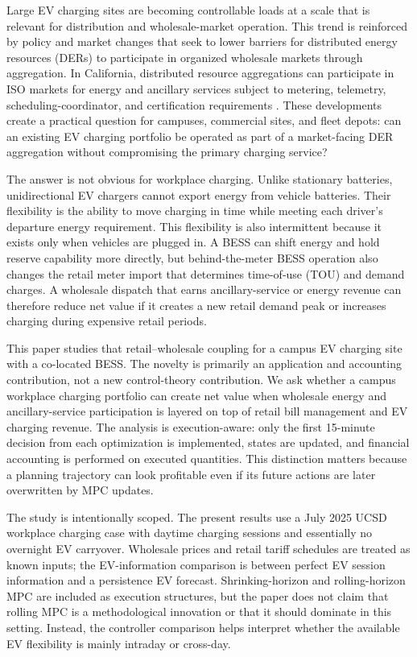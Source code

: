 \documentclass[final,5p,times]{elsarticle}
\begin{document}
Large EV charging sites are becoming controllable loads at a scale that is relevant for distribution and wholesale-market operation. This trend is reinforced by policy and market changes that seek to lower barriers for distributed energy resources (DERs) to participate in organized wholesale markets through aggregation. In California, distributed resource aggregations can participate in ISO markets for energy and ancillary services subject to metering, telemetry, scheduling-coordinator, and certification requirements \cite{ferc2222}. These developments create a practical question for campuses, commercial sites, and fleet depots: can an existing EV charging portfolio be operated as part of a market-facing DER aggregation without compromising the primary charging service?

The answer is not obvious for workplace charging. Unlike stationary batteries, unidirectional EV chargers cannot export energy from vehicle batteries. Their flexibility is the ability to move charging in time while meeting each driver's departure energy requirement. This flexibility is also intermittent because it exists only when vehicles are plugged in. A BESS can shift energy and hold reserve capability more directly, but behind-the-meter BESS operation also changes the retail meter import that determines time-of-use (TOU) and demand charges. A wholesale dispatch that earns ancillary-service or energy revenue can therefore reduce net value if it creates a new retail demand peak or increases charging during expensive retail periods.

This paper studies that retail--wholesale coupling for a campus EV charging site with a co-located BESS. The novelty is primarily an application and accounting contribution, not a new control-theory contribution. We ask whether a campus workplace charging portfolio can create net value when wholesale energy and ancillary-service participation is layered on top of retail bill management and EV charging revenue. The analysis is execution-aware: only the first 15-minute decision from each optimization is implemented, states are updated, and financial accounting is performed on executed quantities. This distinction matters because a planning trajectory can look profitable even if its future actions are later overwritten by MPC updates.

The study is intentionally scoped. The present results use a July 2025 UCSD workplace charging case with daytime charging sessions and essentially no overnight EV carryover. Wholesale prices and retail tariff schedules are treated as known inputs; the EV-information comparison is between perfect EV session information and a persistence EV forecast. Shrinking-horizon and rolling-horizon MPC are included as execution structures, but the paper does not claim that rolling MPC is a methodological innovation or that it should dominate in this setting. Instead, the controller comparison helps interpret whether the available EV flexibility is mainly intraday or cross-day.
\end{document}
